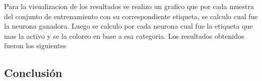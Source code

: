 Para la visualizacion de los resultados se realizo un grafico que por cada
muestra del conjunto de entrenamiento con su correspondiente etiqueta, se
calculo cual fue la neurona ganadora. Luego se calculo por cada neurona cual
fue la etiqueta que mas la activo y se la coloreo en base a esa categoria.  Los
resultados obtenidos fueron los siguientes

\subsection{Conclusión}
